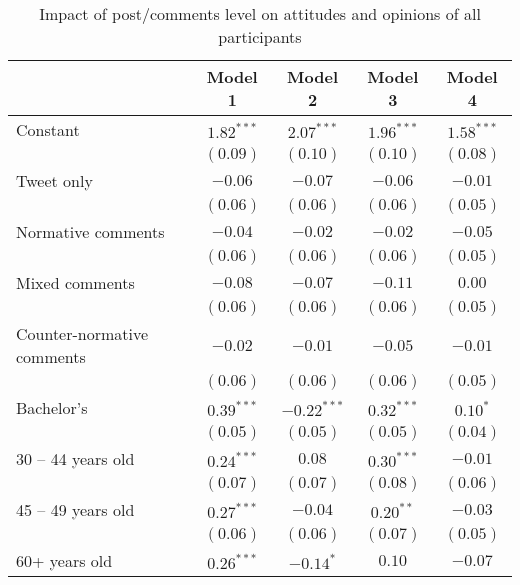 
\begin{table}[h!]
\caption{Impact of post/comments level on attitudes and opinions of all participants}
\begin{center}
\begin{scriptsize}
\begin{tabular}{l c c c c}
\toprule
 & Model 1 & Model 2 & Model 3 & Model 4 \\
\midrule
Constant                   & $1.82^{***}$  & $2.07^{***}$  & $1.96^{***}$  & $1.58^{***}$ \\
                           & $(0.09)$      & $(0.10)$      & $(0.10)$      & $(0.08)$     \\
Tweet only                 & $-0.06$       & $-0.07$       & $-0.06$       & $-0.01$      \\
                           & $(0.06)$      & $(0.06)$      & $(0.06)$      & $(0.05)$     \\
Normative comments         & $-0.04$       & $-0.02$       & $-0.02$       & $-0.05$      \\
                           & $(0.06)$      & $(0.06)$      & $(0.06)$      & $(0.05)$     \\
Mixed comments             & $-0.08$       & $-0.07$       & $-0.11$       & $0.00$       \\
                           & $(0.06)$      & $(0.06)$      & $(0.06)$      & $(0.05)$     \\
Counter-normative comments & $-0.02$       & $-0.01$       & $-0.05$       & $-0.01$      \\
                           & $(0.06)$      & $(0.06)$      & $(0.06)$      & $(0.05)$     \\
Bachelor's                 & $0.39^{***}$  & $-0.22^{***}$ & $0.32^{***}$  & $0.10^{*}$   \\
                           & $(0.05)$      & $(0.05)$      & $(0.05)$      & $(0.04)$     \\
30 -- 44 years old         & $0.24^{***}$  & $0.08$        & $0.30^{***}$  & $-0.01$      \\
                           & $(0.07)$      & $(0.07)$      & $(0.08)$      & $(0.06)$     \\
45 -- 49 years old         & $0.27^{***}$  & $-0.04$       & $0.20^{**}$   & $-0.03$      \\
                           & $(0.06)$      & $(0.06)$      & $(0.07)$      & $(0.05)$     \\
60+ years old              & $0.26^{***}$  & $-0.14^{*}$   & $0.10$        & $-0.07$      \\

\end{tabular}
\end{scriptsize}
\end{center}
\end{table}
